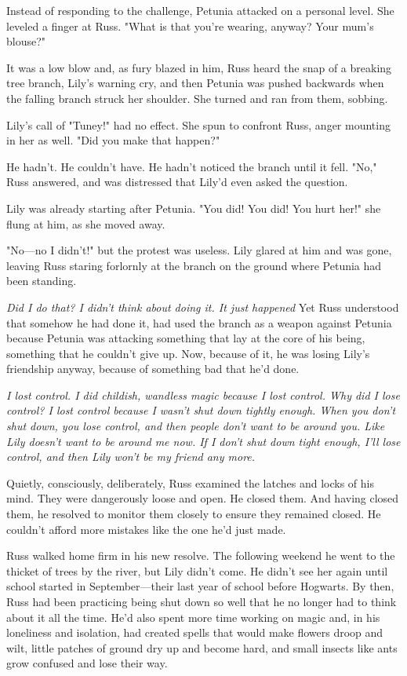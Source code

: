 Instead of responding to the challenge, Petunia attacked on a personal level. She leveled a finger at Russ. "What is that you're wearing, anyway? Your mum's blouse?"

It was a low blow and, as fury blazed in him, Russ heard the snap of a breaking tree branch, Lily's warning cry, and then Petunia was pushed backwards when the falling branch struck her shoulder. She turned and ran from them, sobbing.

Lily's call of "Tuney!" had no effect. She spun to confront Russ, anger mounting in her as well. "Did you make that happen?"

He hadn't. He couldn't have. He hadn't noticed the branch until it fell. "No," Russ answered, and was distressed that Lily'd even asked the question.

Lily was already starting after Petunia. "You did! You did! You hurt her!" she flung at him, as she moved away.

"No—no I didn't!" but the protest was useless. Lily glared at him and was gone, leaving Russ staring forlornly at the branch on the ground where Petunia had been standing.

\emph{Did I do that? I didn't think about doing it. It just happened{\el}} Yet Russ understood that somehow he had done it, had used the branch as a weapon against Petunia because Petunia was attacking something that lay at the core of his being, something that he couldn't give up. Now, because of it, he was losing Lily's friendship anyway, because of something bad that he'd done.

\emph{I lost control. I did childish, wandless magic because I lost control. Why did I lose control? I lost control because I wasn't shut down tightly enough. When you don't shut down, you lose control, and then people don't want to be around you. Like Lily doesn't want to be around me now. If I don't shut down tight enough, I'll lose control, and then Lily won't be my friend any more.}

Quietly, consciously, deliberately, Russ examined the latches and locks of his mind. They were dangerously loose and open. He closed them. And having closed them, he resolved to monitor them closely to ensure they remained closed. He couldn't afford more mistakes like the one he'd just made.

Russ walked home firm in his new resolve. The following weekend he went to the thicket of trees by the river, but Lily didn't come. He didn't see her again until school started in September—their last year of school before Hogwarts. By then, Russ had been practicing being shut down so well that he no longer had to think about it all the time. He'd also spent more time working on magic and, in his loneliness and isolation, had created spells that would make flowers droop and wilt, little patches of ground dry up and become hard, and small insects like ants grow confused and lose their way.


